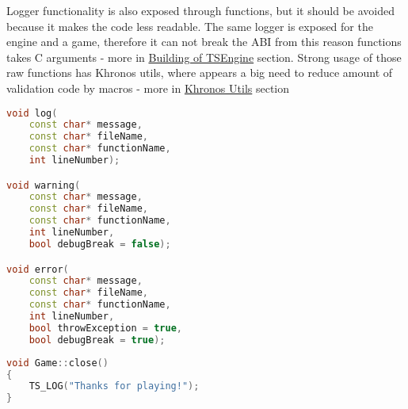 Logger functionality is also exposed through functions, but it should be avoided because it makes the code less readable. The same logger is exposed for the engine and a game, therefore it can not break the ABI from this reason functions takes C arguments - more in \hyperref[sec:build]{Building of TSEngine} section.
Strong usage of those raw functions has Khronos utils, where appears a big need to reduce amount of validation code by macros - more in \hyperref[sec:khronos_utils]{Khronos Utils} section
\begin{lstlisting}[language=c++, caption=Logger's functions (./engine/include/tsengine/logger.h)]
void log(
    const char* message,
    const char* fileName,
    const char* functionName,
    int lineNumber);

void warning(
    const char* message,
    const char* fileName,
    const char* functionName,
    int lineNumber,
    bool debugBreak = false);

void error(
    const char* message,
    const char* fileName,
    const char* functionName,
    int lineNumber,
    bool throwException = true,
    bool debugBreak = true);
\end{lstlisting}

\begin{lstlisting}[language=c++, caption=An example of a Logger message(./engine/include/tsengine/logger.h)]
void Game::close()
{
    TS_LOG("Thanks for playing!");
}
\end{lstlisting}